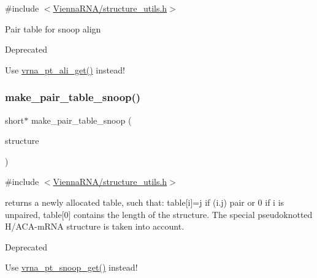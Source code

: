 {\ttfamily \#include $<$\mbox{\hyperlink{structure__utils_8h}{Vienna\+R\+N\+A/structure\+\_\+utils.\+h}}$>$}

Pair table for snoop align

\begin{DoxyRefDesc}{Deprecated}
\item[\mbox{\hyperlink{deprecated__deprecated000142}{Deprecated}}]Use \mbox{\hyperlink{group__struct__utils_ga1ee4cdcda1f57d32dcb38032116d335d}{vrna\+\_\+pt\+\_\+ali\+\_\+get()}} instead! \end{DoxyRefDesc}
\mbox{\label{group__struct__utils_ga9aa3bf3b4346bb7fb88efc154dd07a79}} 
\subsubsection{\texorpdfstring{make\+\_\+pair\+\_\+table\+\_\+snoop()}{make\_pair\_table\_snoop()}}
{\footnotesize\ttfamily short$\ast$ make\+\_\+pair\+\_\+table\+\_\+snoop (\begin{DoxyParamCaption}\item[{const char $\ast$}]{structure }\end{DoxyParamCaption})}



{\ttfamily \#include $<$\mbox{\hyperlink{structure__utils_8h}{Vienna\+R\+N\+A/structure\+\_\+utils.\+h}}$>$}

returns a newly allocated table, such that\+: table\mbox{[}i\mbox{]}=j if (i.\+j) pair or 0 if i is unpaired, table\mbox{[}0\mbox{]} contains the length of the structure. The special pseudoknotted H/\+A\+C\+A-\/m\+R\+NA structure is taken into account. \begin{DoxyRefDesc}{Deprecated}
\item[\mbox{\hyperlink{deprecated__deprecated000143}{Deprecated}}]Use \mbox{\hyperlink{group__struct__utils_gaef0f7e1a6c00c81a349973de53039dda}{vrna\+\_\+pt\+\_\+snoop\+\_\+get()}} instead! \end{DoxyRefDesc}
\mbox{\label{group__struct__utils_ga4358e89f64cc87a563b7ef3855f75bed}} 
